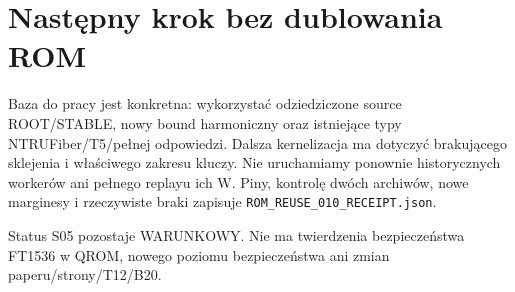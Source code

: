 \documentclass[11pt,a4paper]{article}
\newcommand{\code}[1]{\nolinkurl{#1}}
\begin{document}
\section{Następny krok bez dublowania ROM}
Baza do pracy jest konkretna: wykorzystać odziedziczone source ROOT/STABLE,
nowy bound harmoniczny oraz istniejące typy NTRUFiber/T5/pełnej odpowiedzi.
Dalsza kernelizacja ma dotyczyć brakującego sklejenia i właściwego zakresu
kluczy. Nie uruchamiamy ponownie historycznych workerów ani pełnego replayu
ich W. Piny, kontrolę dwóch archiwów, nowe marginesy i rzeczywiste braki
zapisuje \code{ROM_REUSE_010_RECEIPT.json}.

Status S05 pozostaje WARUNKOWY. Nie ma twierdzenia bezpieczeństwa FT1536
w QROM, nowego poziomu bezpieczeństwa ani zmian paperu/strony/T12/B20.
\end{document}
